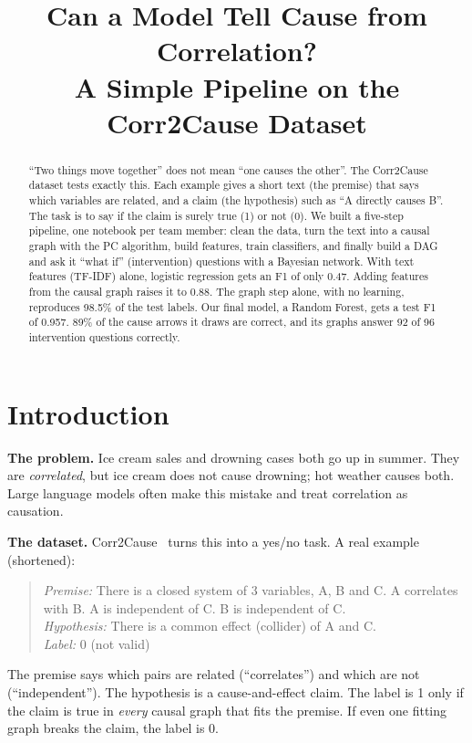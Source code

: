 \documentclass[conference]{IEEEtran}
\begin{document}
\title{Can a Model Tell Cause from Correlation?\\
A Simple Pipeline on the Corr2Cause Dataset}

\author{
}

\maketitle

\begin{abstract}
``Two things move together'' does not mean ``one causes the other''. The Corr2Cause dataset tests exactly
this. Each example gives a short text (the premise) that says which variables are related, and a claim (the
hypothesis) such as ``A directly causes B''. The task is to say if the claim is surely true (1) or not (0). We
built a five-step pipeline, one notebook per team member: clean the data, turn the text into a causal graph with
the PC algorithm, build features, train classifiers, and finally build a DAG and ask it ``what if''
(intervention) questions with a Bayesian network. With text features (TF-IDF) alone, logistic regression gets an
F1 of only 0.47. Adding features from the causal graph raises it to 0.88. The graph step alone, with no learning,
reproduces 98.5\% of the test labels. Our final model, a Random Forest, gets a test F1 of 0.957. 89\% of the
cause arrows it draws are correct, and its graphs answer 92 of 96 intervention questions correctly.
\end{abstract}

\section{Introduction}
\textbf{The problem.} Ice cream sales and drowning cases both go up in summer. They are \emph{correlated}, but
ice cream does not cause drowning; hot weather causes both. Large language models often make this mistake and
treat correlation as causation.

\textbf{The dataset.} Corr2Cause~\cite{jin2024} turns this into a yes/no task. A real example (shortened):
\begin{quote}\small
\emph{Premise:} There is a closed system of 3 variables, A, B and C. A correlates with B. A is independent of C.
B is independent of C.\\
\emph{Hypothesis:} There is a common effect (collider) of A and C.\\
\emph{Label:} 0 (not valid)
\end{quote}
The premise says which pairs are related (``correlates'') and which are not (``independent''). The hypothesis
is a cause-and-effect claim. The label is 1 only if the claim is true in \emph{every} causal graph that fits the
premise. If even one fitting graph breaks the claim, the label is 0.
\end{document}
